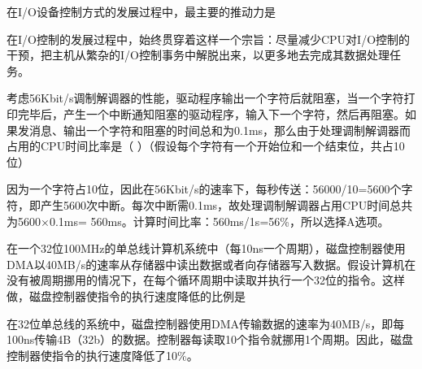 \question 在I/O设备控制方式的发展过程中，最主要的推动力是
\par{}
\begin{solution}在I/O控制的发展过程中，始终贯穿着这样一个宗旨：尽量减少CPU对I/O控制的干预，把主机从繁杂的I/O控制事务中解脱出来，以更多地去完成其数据处理任务。
\end{solution}
\question 考虑56Kbit/s调制解调器的性能，驱动程序输出一个字符后就阻塞，当一个字符打印完毕后，产生一个中断通知阻塞的驱动程序，输入下一个字符，然后再阻塞。如果发消息、输出一个字符和阻塞的时间总和为0.1ms，那么由于处理调制解调器而占用的CPU时间比率是（
）（假设每个字符有一个开始位和一个结束位，共占10位）
\par{}
\begin{solution}因为一个字符占10位，因此在56Kbit/s的速率下，每秒传送：56000/10=5600个字符，即产生5600次中断。每次中断需0.1ms，故处理调制解调器占用CPU时间总共为5600×0.1ms=
560ms。计算时间比率：560ms/1s=56\%，所以选择A选项。
\end{solution}
\question 在一个32位100MHz的单总线计算机系统中（每10ns一个周期），磁盘控制器使用DMA以40MB/s的速率从存储器中读出数据或者向存储器写入数据。假设计算机在没有被周期挪用的情况下，在每个循环周期中读取并执行一个32位的指令。这样做，磁盘控制器使指令的执行速度降低的比例是
\par{}
\begin{solution}在32位单总线的系统中，磁盘控制器使用DMA传输数据的速率为40MB/s，即每100ns传输4B（32b）的数据。控制器每读取10个指令就挪用1个周期。因此，磁盘控制器使指令的执行速度降低了10\%。
\end{solution}
